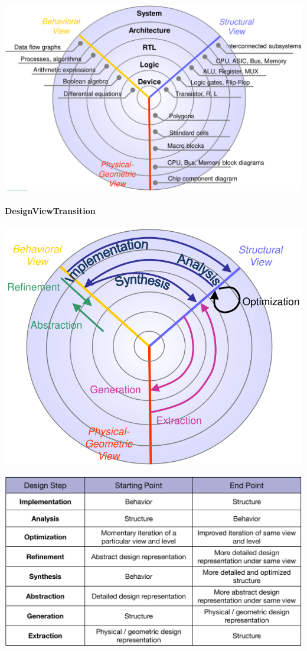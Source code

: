 \documentclass[english]{latex4ei/latex4ei_sheet}
\begin{document}
\begin{center}
  \includegraphics[width=0.8\linewidth]{assets/DesignViews.png}
\end{center}

\paragraph{DesignViewTransition}
\begin{center}
  \includegraphics[width=0.7\linewidth]{assets/DesignViewTransitions.png}
\end{center}

\begin{center}
  \includegraphics[width=0.8\linewidth]{assets/DesignViewTransitionTable.png}
\end{center}
\end{document}
